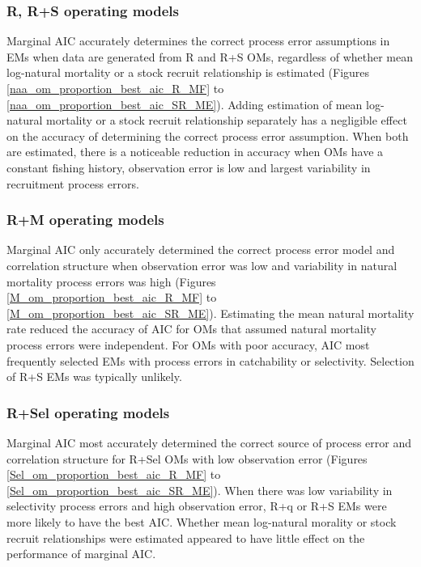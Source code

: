 \documentclass[
  12pt,
]{article}
\begin{document}
\hypertarget{r-rs-operating-models-1}{%
\subsubsection*{R, R+S operating models}\label{r-rs-operating-models-1}}

Marginal AIC accurately determines the correct process error assumptions
in EMs when data are generated from R and R+S OMs, regardless of whether
mean log-natural mortality or a stock recruit relationship is estimated
(Figures \ref{naa_om_proportion_best_aic_R_MF} to
\ref{naa_om_proportion_best_aic_SR_ME}). Adding estimation of mean
log-natural mortality or a stock recruit relationship separately has a
negligible effect on the accuracy of determining the correct process
error assumption. When both are estimated, there is a noticeable
reduction in accuracy when OMs have a constant fishing history,
observation error is low and largest variability in recruitment process
errors.

\hypertarget{rm-operating-models-1}{%
\subsubsection*{R+M operating models}\label{rm-operating-models-1}}

Marginal AIC only accurately determined the correct process error model
and correlation structure when observation error was low and variability
in natural mortality process errors was high (Figures
\ref{M_om_proportion_best_aic_R_MF} to
\ref{M_om_proportion_best_aic_SR_ME}). Estimating the mean natural
mortality rate reduced the accuracy of AIC for OMs that assumed natural
mortality process errors were independent. For OMs with poor accuracy,
AIC most frequently selected EMs with process errors in catchability or
selectivity. Selection of R+S EMs was typically unlikely.

\hypertarget{rsel-operating-models-1}{%
\subsubsection*{R+Sel operating models}\label{rsel-operating-models-1}}

Marginal AIC most accurately determined the correct source of process
error and correlation structure for R+Sel OMs with low observation error
(Figures \ref{Sel_om_proportion_best_aic_R_MF} to
\ref{Sel_om_proportion_best_aic_SR_ME}). When there was low variability
in selectivity process errors and high observation error, R+q or R+S EMs
were more likely to have the best AIC. Whether mean log-natural morality
or stock recruit relationships were estimated appeared to have little
effect on the performance of marginal AIC.
\end{document}
